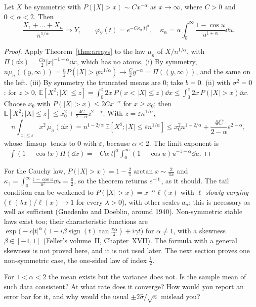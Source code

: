 \begin{theorem}\label{thm:domain}
Let $X$ be symmetric with $P(|X|>x)\sim Cx^{-\alpha}$ as $x\to\infty$, where $C>0$ and $0<\alpha<2$. Then
\[
\frac{X_1+\dots+X_n}{n^{1/\alpha}}\Rightarrow Y,\qquad\varphi_Y(t)=e^{-C\kappa_\alpha|t|^\alpha},\quad\kappa_\alpha=\alpha\int_0^\infty\frac{1-\cos u}{u^{1+\alpha}}\dd u.
\]
\end{theorem}
\begin{proof}
Apply Theorem~\ref{thm:arrays} to the law $\mu_n$ of $X/n^{1/\alpha}$, with $\Pi(\dd x)=\frac{C\alpha}2|x|^{-1-\alpha}\dd x$, which has no atoms. (i) By symmetry,
$n\mu_n((y,\infty))=\frac n2P(|X|>yn^{1/\alpha})\to\frac C2y^{-\alpha}=\Pi((y,\infty))$, and the same on the left. (iii) By symmetry the truncated means are $0$; take $b=0$.
(ii) with $\sigma^2=0$: for $z>0$, $\mathbb E[X^2;|X|\le z]=\int_0^z2x\,P(x<|X|\le z)\dd x\le\int_0^z2x\,P(|X|>x)\dd x$. Choose $x_0$ with $P(|X|>x)\le2Cx^{-\alpha}$ for
$x\ge x_0$; then $\mathbb E[X^2;|X|\le z]\le x_0^2+\frac{4C}{2-\alpha}z^{2-\alpha}$. With $z=\varepsilon n^{1/\alpha}$,
\[
n\int_{|x|\le\varepsilon}x^2\,\mu_n(\dd x)=n^{1-2/\alpha}\,\mathbb E[X^2;|X|\le\varepsilon n^{1/\alpha}]\le x_0^2n^{1-2/\alpha}+\frac{4C}{2-\alpha}\varepsilon^{2-\alpha},
\]
whose $\limsup$ tends to $0$ with $\varepsilon$, because $\alpha<2$. The limit exponent is $-\int(1-\cos tx)\Pi(\dd x)=-C\alpha|t|^\alpha\int_0^\infty(1-\cos u)u^{-1-\alpha}\dd u$.
\end{proof}

For the Cauchy law, $P(|X|>x)=1-\frac2\pi\arctan x\sim\frac2{\pi x}$ and $\kappa_1=\int_0^\infty\frac{1-\cos u}{u^2}\dd u=\frac\pi2$, so the theorem returns $e^{-|t|}$, as it should.
The tail condition can be weakened to $P(|X|>x)=x^{-\alpha}\ell(x)$ with $\ell$ \emph{slowly varying} ($\ell(\lambda x)/\ell(x)\to1$ for every $\lambda>0$), with
other scales $a_n$; this is necessary as well as sufficient (Gnedenko and Doeblin, around 1940). Non-symmetric stable laws exist too; their characteristic
functions are $\exp\bigl(-c|t|^\alpha(1-i\beta\operatorname{sign}(t)\tan\frac{\pi\alpha}2)+i\gamma t\bigr)$ for $\alpha\ne1$, with a skewness $\beta\in[-1,1]$ (Feller's volume~II,
Chapter~XVII). The formula with a general skewness is not proved here, and it is not used later. The next section proves one non-symmetric case, the one-sided law of index $\frac12$.

\begin{think}
For $1<\alpha<2$ the mean exists but the variance does not. Is the sample mean of such data consistent? At what rate does it converge? How would you
report an error bar for it, and why would the usual $\pm2\hat\sigma/\sqrt n$ mislead you?
\end{think}


